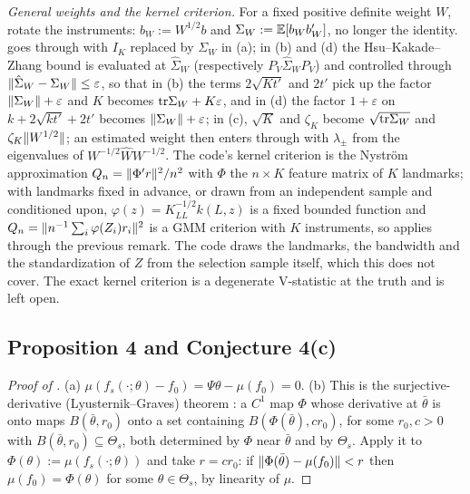 \medskip\noindent\emph{General weights and the kernel criterion.} For a fixed positive definite weight $W$, rotate the instruments: $b_W := W^{1/2}b$ and $\Sigma_W := \mathbb{E}[b_Wb_W']$, no longer the identity.  goes through with $I_K$ replaced by $\Sigma_W$ in (a); in (b) and (d) the Hsu--Kakade--Zhang bound is evaluated at $\hat\Sigma_W$ (respectively $P_V\hat\Sigma_WP_V$) and controlled through $\lVert \hat\Sigma_W - \Sigma_W\rVert \le \varepsilon$, so that in (b) the terms $2\sqrt{Kt'}$ and $2t'$ pick up the factor $\lVert \Sigma_W\rVert + \varepsilon$ and $K$ becomes $\mathrm{tr}\Sigma_W + K\varepsilon$, and in (d) the factor $1 + \varepsilon$ on $k + 2\sqrt{kt'} + 2t'$ becomes $\lVert \Sigma_W\rVert + \varepsilon$; in (c), $\sqrt K$ and $\zeta_K$ become $\sqrt{\mathrm{tr}\Sigma_W}$ and $\zeta_K\lVert W^{1/2}\rVert$; an estimated weight then enters through  with $\lambda_\pm$ from the eigenvalues of $W^{-1/2}\hat WW^{-1/2}$. The code's kernel criterion is the Nystr\"om approximation $Q_n = \lVert \Phi'r\rVert^2/n^2$ with $\Phi$ the $n \times K$ feature matrix of $K$ landmarks; with landmarks fixed in advance, or drawn from an independent sample and conditioned upon, $\varphi(z) = K_{LL}^{-1/2}k(L, z)$ is a fixed bounded function and $Q_n = \lVert n^{-1}\sum_i\varphi(Z_i)r_i\rVert^2$ is a GMM criterion with $K$ instruments, so  applies through the previous remark. The code draws the landmarks, the bandwidth and the standardization of $Z$ from the selection sample itself, which this does not cover. The exact kernel criterion is a degenerate V-statistic at the truth and is left open.

\subsection{Proposition 4 and Conjecture 4(c)}
\label{app:prop4}

\begin{proof}[Proof of ]
(a) $\mu(f_s(\cdot;\theta) - f_0) = \Psi\theta - \mu(f_0) = 0$.
(b) This is the surjective-derivative (Lyusternik--Graves) theorem \citep{graves1950}: a $C^1$ map $\Phi$ whose derivative at $\bar\theta$ is onto maps $B(\bar\theta, r_0)$ onto a set containing $B(\Phi(\bar\theta), cr_0)$, for some $r_0, c > 0$ with $B(\bar\theta, r_0) \subseteq \Theta_s$, both determined by $\Phi$ near $\bar\theta$ and by $\Theta_s$. Apply it to $\Phi(\theta) := \mu(f_s(\cdot;\theta))$ and take $r = cr_0$: if $\lVert \Phi(\bar\theta) - \mu(f_0)\rVert < r$ then $\mu(f_0) = \Phi(\theta)$ for some $\theta \in \Theta_s$, by linearity of $\mu$.
\end{proof}

